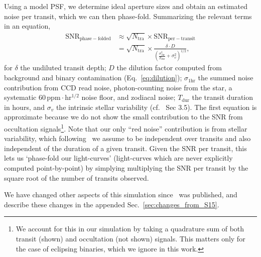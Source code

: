 Using a model PSF, we determine ideal aperture sizes and obtain 
an estimated noise per transit, which we can then phase-fold. 
Summarizing the relevant terms in an equation,
\begin{align}
    \mathrm{SNR}_\mathrm{phase-folded} &\approx
	\sqrt{N_\mathrm{tra}} \times \mathrm{SNR}_\mathrm{per-transit}\nonumber \\
	 &= \sqrt{N_\mathrm{tra}} \times 
	\frac{\delta \cdot D}{\left(\frac{\sigma_\mathrm{1hr}^2}{T_\mathrm{dur}} 
		+ \sigma_v^2 \right)^{1/2}}, 
	\label{eq:snr} 
\end{align}
for $\delta$ the undiluted transit depth; $D$ the dilution factor
computed from background and binary contamination (Eq.~\ref{eq:dilution});
$\sigma_\mathrm{1hr}$ the summed noise contribution from CCD read noise, 
photon-counting noise from the star, a systematic 
$60\,\mathrm{ppm\cdot hr^{1/2}}$ noise floor, and zodiacal noise;
$T_\mathrm{dur}$ the transit duration in hours, and $\sigma_v$ the intrinsic
stellar variability (cf.~ Sec 3.5).
The first equation is approximate because we do not
show the small contribution to the SNR from occultation 
signals\footnote{We account for this in our simulation by taking a quadrature 
sum of both transit (shown) and occultation (not shown) signals. This matters 
only for the case of eclipsing binaries, which we ignore 
in this work.}.
Note that our only ``red noise'' contribution is from stellar variability, 
which following~ we assume to be independent over 
transits and also independent of the duration of a given transit.
Given the SNR per transit, this lets us `phase-fold our light-curves' 
(light-curves which are never explicitly computed point-by-point) by simplying 
multiplying the SNR per transit by the square root of the number of transits
observed.

We have changed other aspects of this simulation
since~ was published, and describe these
changes in the appended Sec.~\ref{sec:changes_from_S15}.
